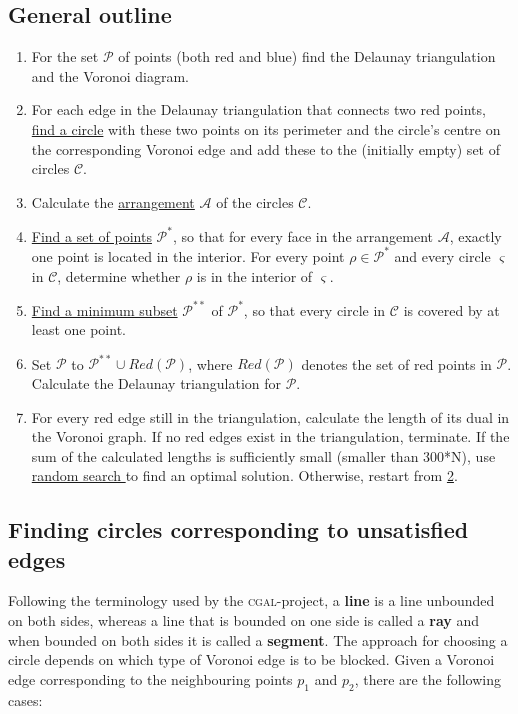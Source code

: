 \documentclass[a4paper,12pt]{article}
\begin{document}
\subsection{General outline}
\label{ref:Algorithm}
\begin{enumerate}
\item
For the set $\mathcal P$ of points (both red and blue) find the Delaunay triangulation and the Voronoi diagram.
\item
\label{alg:part2}
For each edge in the Delaunay triangulation that connects two red points, \hyperref[sec:findCircle]{find a circle} with these two points on its perimeter and the circle's centre on the corresponding Voronoi edge and add these to the (initially empty) set of circles $\mathcal C$.
\item
Calculate the \hyperref[sec:arrangement]{arrangement} $\mathcal A$ of the circles $\mathcal C$.
\item
\hyperref[sec:findPoints]{Find a set of points} $\mathcal P^*$, so that for every face in the arrangement $\mathcal A$, exactly one point is located in the interior. For every point $\rho  \in \mathcal P^*$ and every circle $\varsigma$ in $\mathcal C$, determine whether $\rho$ is in the interior of $\varsigma$.
\item
\hyperref[sec:gurobi]{Find a minimum subset} $\mathcal P^{**}$ of $\mathcal P^*$, so that every circle in $\mathcal C$ is covered by at least one point.
\item
Set $\mathcal P$ to $\mathcal P^{**} \cup Red(\mathcal P )$, where  $Red(\mathcal P )$ denotes the set of red points in $\mathcal P$. Calculate the Delaunay triangulation for $\mathcal P$.
\item
For every red edge still in the triangulation, calculate the length of its dual in the Voronoi graph. If no red edges exist in the triangulation, terminate. If the sum of the calculated lengths is sufficiently small (smaller than 300*N), use \hyperref[sec:rand]{random search } to find an optimal solution. Otherwise, restart from \hyperref[alg:part2]{2}.
\end{enumerate}

\subsection{Finding circles corresponding to unsatisfied edges}
\label{sec:findCircle}
Following the terminology used by the \textsc{cgal}-project, a {\bf line} is a line unbounded on both sides, whereas a line that is bounded on one side is called a {\bf ray} and when bounded on both sides it is called a {\bf segment}. \newline 
The approach for choosing a circle depends on which type of Voronoi edge is to be blocked. Given a Voronoi edge corresponding to the neighbouring points $p_1$ and $p_2$, there are the following cases:
\end{document}
